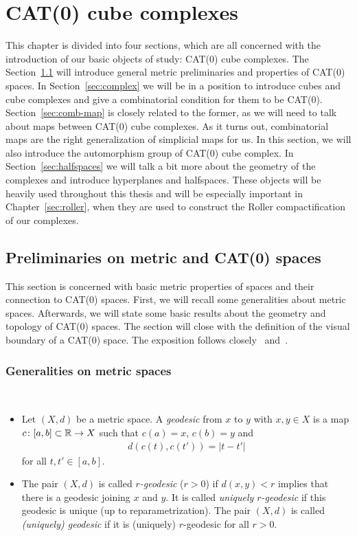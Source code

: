 \section{CAT(0) cube complexes}
\label{sec:complexes}
This chapter is divided into four sections, which are all concerned with the introduction of our basic objects of study: CAT(0) cube complexes. The Section~\ref{sec:metric} will introduce general metric preliminaries and properties of CAT(0) spaces. In Section~\ref{sec:complex} we will be in a position to introduce cubes and cube complexes and give a combinatorial condition for them to be CAT(0). Section~\ref{sec:comb-map} is closely related to the former, as we will need to talk about maps between CAT(0) cube complexes. As it turns out, combinatorial maps are the right generalization of simplicial maps for us. In this section, we will also introduce the automorphism group of CAT(0) cube complex. In Section~\ref{sec:halfspaces} we will talk a bit more about the geometry of the complexes and introduce hyperplanes and halfspaces. These objects will be heavily used throughout this thesis and will be especially important in Chapter~\ref{sec:roller}, when they are used to construct the Roller compactification of our complexes.

\subsection{Preliminaries on metric and CAT(0) spaces}
\label{sec:metric}
This section is concerned with basic metric properties of spaces and their connection to CAT(\(0\)) spaces. First, we will recall some generalities about metric spaces. Afterwards, we will state some basic results about the geometry and topology of CAT(0) spaces. The section will close with the definition of the visual boundary of a CAT(0) space. The exposition follows closely~\cite{MR1744486} and~\cite{Rolli2012}.

\subsubsection*{Generalities on metric spaces}
\label{sec:gen-met}

\begin{defin}[Geodesics]~\vspace{-6pt}
  \begin{itemize}
  \item Let \((X, d)\) be a metric space. A \emph{geodesic} from \(x\) to \(y\) with \(x,y \in X\) is a map \(c\colon [a,b]\subset \mathbb{R} \to X\) such that \(c(a) = x\), \(c(b) = y\) and
    \begin{align*}
      d(c(t), c(t')) = |t - t'| 
    \end{align*}
    for all \(t,t' \in [a,b]\).
  \item The pair \((X,d)\) is called \emph{\(r\)-geodesic} (\(r > 0\)) if \(d(x,y) < r\) implies that there is a geodesic joining \(x\) and \(y\). It is called \emph{uniquely \(r\)-geodesic} if this geodesic is unique (up to reparametrization). The pair \((X,d)\) is called \emph{(uniquely) geodesic} if it is (uniquely) \(r\)-geodesic for all \(r > 0\).
  \end{itemize}
\end{defin}

